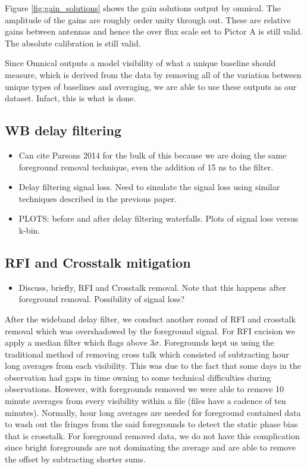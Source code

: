 \documentclass[twocolumn,numberedappendix]{emulateapj}
\begin{document}
{Figure \ref{fig:gain_solutions} shows the gain solutions output by omnical. The
amplitude of the gains are roughly order unity through out. These are relative
gains between antennas and hence the over flux scale set to Pictor A is still
valid. The absolute calibration is still valid. 

Since Omnical outputs a model visibility of what a unique baseline should
measure, which is derived from the data by removing all of the variation between
unique types of baselines and averaging, we are able to use these outputs as our
dataset. Infact, this is what is done. 
%




\subsection{WB delay filtering}
\begin{itemize}
    \item{Can cite Parsons 2014 for the bulk of this because we are doing the
same foreground removal technique, even the addition of 15 ns to the filter.}
    \item{Delay filtering signal loss. Need to simulate the signal loss using
similar techniques described in the previous paper.}
    \item{PLOTS: before and after delay filtering waterfalls. Plots of signal
loss versus k-bin.}
\end{itemize}

\subsection{RFI and Crosstalk mitigation}
\begin{itemize}
    \item{Discuss, briefly, RFI and Crosstalk removal. Note that this happens
after foreground removal. Possibility of signal loss?}
\end{itemize}
After the wideband delay filter, we conduct another round of RFI and crosstalk
removal which was overshadowed by the foreground signal. For RFI excision we
apply a median filter which flags above $3\sigma$. Foregrounds kept us using the
traditional method of removing cross talk which consisted of subtracting hour
long averages from each visibility. This was due to the fact that some days in
the observation had gaps in time owning to some technical difficulties during
observations. However, with foregrounds removed we were able to remove 10 minute
averages from every visibility within a file (files have a cadence of ten
minutes). Normally, hour long averages are needed for foreground contained data
to wash out the fringes from the said foregrounds to detect the static phase
bias that is crosstalk. For foreground removed data, we do not have this
complication since bright foregrounds are not dominating the average and are
able to remove the offset by subtracting shorter sums.

}
\end{document}
